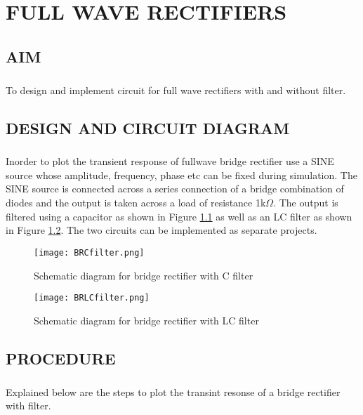 \chapter{FULL WAVE RECTIFIERS}

\section*{AIM}
\paragraph{}To design and implement circuit for full wave rectifiers with and without filter.
\section*{DESIGN AND CIRCUIT DIAGRAM}
\paragraph{}

Inorder to plot the transient response of fullwave bridge rectifier use a SINE source whose amplitude, frequency, phase etc can be fixed during simulation. The SINE source is connected across a series connection of a bridge combination of diodes and the output is taken across a load of resistance 1k$\Omega$. The output is filtered using a capacitor as shown in Figure \ref{BRCfilter}	as well as an LC filter as shown in Figure \ref{BRLCfilter}. The two circuits can be implemented as separate projects.

\begin{figure}[h]
\centering
\texttt{[image: BRCfilter.png]}
\caption{Schematic diagram for bridge rectifier with C filter}
\label{BRCfilter}
\end{figure}

\begin{figure}[h]
\centering
\texttt{[image: BRLCfilter.png]}
\caption{Schematic diagram for bridge rectifier with LC filter}
\label{BRLCfilter}
\end{figure}


\section*{PROCEDURE}

\paragraph{}Explained below are the steps to plot the transint resonse of a bridge rectifier with filter. 
